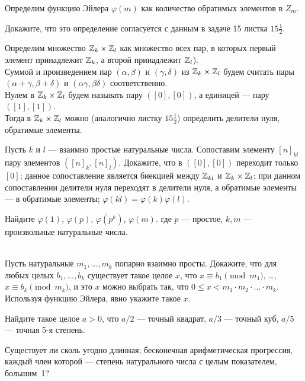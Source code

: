 \documentclass[a4paper, 12pt]{article}
\begin{document}
Определим функцию Эйлера $\varphi(m)$ как количество обратимых элементов в $Z_m$.

Докажите, что это определение согласуется с данным в задаче 15 листка $15\frac12$.

Определим множество $\mathbb{Z}_k\times\mathbb{Z}_l$ как множество всех пар, в которых первый элемент принадлежит $\mathbb{Z}_k$, а второй принадлежит $\mathbb{Z}_l$).\\
Суммой и произведением пар $(\alpha,\beta)$ и $(\gamma,\delta)$ из $\mathbb{Z}_k\times\mathbb{Z}_l$ будем считать пары $(\alpha+\gamma, \beta+\delta)$ и $(\alpha\gamma,\beta\delta)$ соответственно.\\ Нулем в $\mathbb{Z}_k\times\mathbb{Z}_l$ будем называть пару $([0],[0])$, а единицей --- пару $([1],[1])$.\\ Тогда в $\mathbb{Z}_k\times\mathbb{Z}_l$ можно (аналогично листку $15\frac12$) определить делители нуля, обратимые элементы.


 Пусть $k$ и $l$ --- взаимно простые натуральные числа. Сопоставим элементу $[n]_{kl}$ пару элементов $([n]_k,[n]_l)$. Докажите, что
 в $([0],[0])$ переходит только $[0]$;
 данное сопоставление является биекцией между $\mathbb{Z}_{kl}$ и $\mathbb{Z}_k\times\mathbb{Z}_l$;
 при данном сопоставлении делители нуля переходят в делители нуля, а обратимые элементы --- в обратимые элементы;
 $\varphi(kl) = \varphi(k)\varphi(l)$.

 Найдите  $\varphi(1)$,  $\varphi(p)$,  $\varphi(p^k)$,  $\varphi(m)$. где $p$ --- простое, $k,m$ --- произвольные натуральные числа.

\\
 Пусть натуральные $m_1, \dots, m_k$ попарно взаимно просты.
Докажите, что для любых целых $b_1,\dots,b_k$ существует такое
целое $x$, что
$x\equiv b_1\!\pmod{m_1}$, \dots,
$x\equiv b_k\!\pmod{m_k}$,
и это $x$ можно выбрать так, что
$0\leq x< m_1\cdot m_2\cdot\ldots\cdot m_k$.\\
 Используя функцию Эйлера, явно укажите такое $x$.

Найдите такое целое $a>0$, что $a/2$ --- точный квадрат, $a/3$ --- точный куб, $a/5$ --- точная 5-я степень.


Существует ли
сколь угодно длинная;
бесконечная арифметическая прогрессия, каждый член которой --- степень
натурального числа с целым показателем, большим~1?


\end{document}

